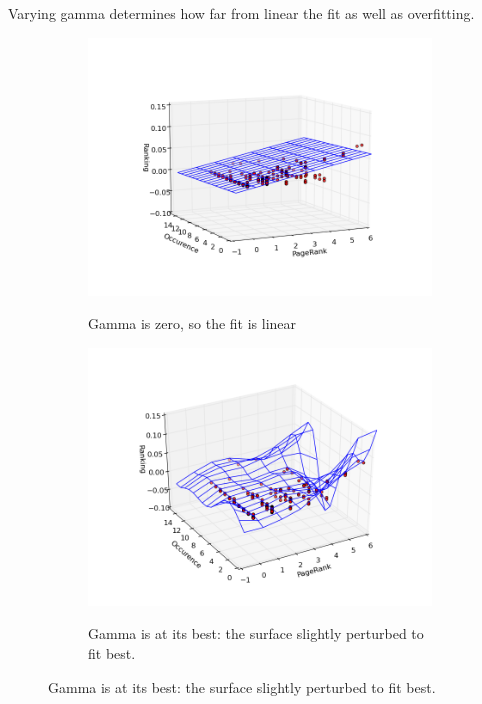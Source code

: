 \documentclass[12pt,notitlepage,twoside]{scrreprt}
\begin{document}
Varying gamma determines how far from linear the fit as well as overfitting.


\begin{figure}[h!]
\centering
\begin{subfigure}[b]{.49\textwidth}
  \centering
  \caption{Gamma is zero, so  the fit is linear}
  \includegraphics[width=\linewidth]{figs/lin_fit.png}
  \label{coarse}
\end{subfigure}
\begin{subfigure}[b]{.49\textwidth}
  \centering
  \caption{Gamma is at its best: the surface slightly perturbed to fit best.}
  \includegraphics[width=\linewidth]{figs/perf_fit.png}
  \label{fine}
\end{subfigure}
\end{figure}
\end{document}
